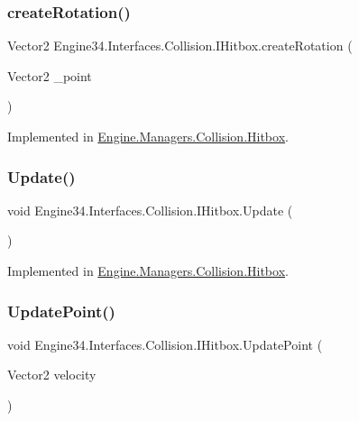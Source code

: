 \subsubsection{\texorpdfstring{create\+Rotation()}{createRotation()}}
{\footnotesize\ttfamily Vector2 Engine34.\+Interfaces.\+Collision.\+I\+Hitbox.\+create\+Rotation (\begin{DoxyParamCaption}\item[{Vector2}]{\+\_\+point }\end{DoxyParamCaption})}



Implemented in \hyperlink{a00506_ae78ae27deafc11bf87c1396c504ce621}{Engine.\+Managers.\+Collision.\+Hitbox}.

\mbox{\label{a00434_a50eba986052aa1f6ac4b49426ab31042}} 
\subsubsection{\texorpdfstring{Update()}{Update()}}
{\footnotesize\ttfamily void Engine34.\+Interfaces.\+Collision.\+I\+Hitbox.\+Update (\begin{DoxyParamCaption}{ }\end{DoxyParamCaption})}



Implemented in \hyperlink{a00506_a987b7fd544e03a9e43e38cc2df785d1d}{Engine.\+Managers.\+Collision.\+Hitbox}.

\mbox{\label{a00434_ae50d408a05951b1e4db24bb468860103}} 
\subsubsection{\texorpdfstring{Update\+Point()}{UpdatePoint()}}
{\footnotesize\ttfamily void Engine34.\+Interfaces.\+Collision.\+I\+Hitbox.\+Update\+Point (\begin{DoxyParamCaption}\item[{Vector2}]{velocity }\end{DoxyParamCaption})}



